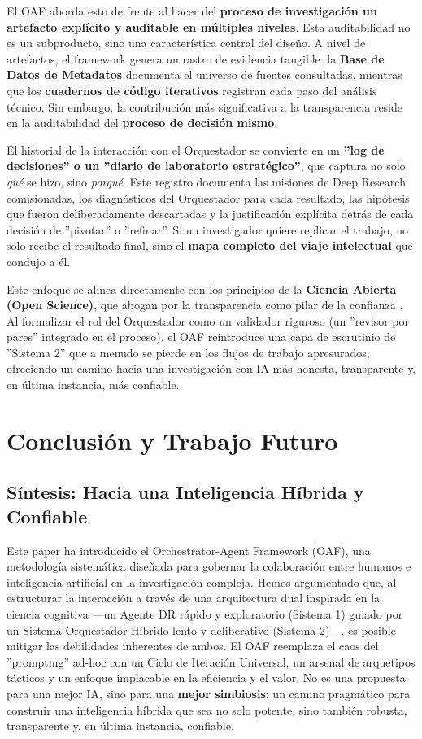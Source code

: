 \documentclass[11pt, a4paper]{article}
\begin{document}
El OAF aborda esto de frente al hacer del \textbf{proceso de investigación un artefacto explícito y auditable en múltiples niveles}. Esta auditabilidad no es un subproducto, sino una característica central del diseño. A nivel de artefactos, el framework genera un rastro de evidencia tangible: la \textbf{Base de Datos de Metadatos} documenta el universo de fuentes consultadas, mientras que los \textbf{cuadernos de código iterativos} registran cada paso del análisis técnico. Sin embargo, la contribución más significativa a la transparencia reside en la auditabilidad del \textbf{proceso de decisión mismo}.

El historial de la interacción con el Orquestador se convierte en un \textbf{''log de decisiones'' o un ''diario de laboratorio estratégico''}, que captura no solo \textit{qué} se hizo, sino \textit{porqué}. Este registro documenta las misiones de Deep Research comisionadas, los diagnósticos del Orquestador para cada resultado, las hipótesis que fueron deliberadamente descartadas y la justificación explícita detrás de cada decisión de ''pivotar'' o ''refinar''. Si un investigador quiere replicar el trabajo, no solo recibe el resultado final, sino el \textbf{mapa completo del viaje intelectual} que condujo a él.

Este enfoque se alinea directamente con los principios de la \textbf{Ciencia Abierta (Open Science)}, que abogan por la transparencia como pilar de la confianza \cite{opus2025}. Al formalizar el rol del Orquestador como un validador riguroso (un ''revisor por pares'' integrado en el proceso), el OAF reintroduce una capa de escrutinio de ''Sistema 2'' que a menudo se pierde en los flujos de trabajo apresurados, ofreciendo un camino hacia una investigación con IA más honesta, transparente y, en última instancia, más confiable.

\section{Conclusión y Trabajo Futuro}
\label{sec:conclusion}

\subsection{Síntesis: Hacia una Inteligencia Híbrida y Confiable}
Este paper ha introducido el Orchestrator-Agent Framework (OAF), una metodología sistemática diseñada para gobernar la colaboración entre humanos e inteligencia artificial en la investigación compleja. Hemos argumentado que, al estructurar la interacción a través de una arquitectura dual inspirada en la ciencia cognitiva —un Agente DR rápido y exploratorio (Sistema 1) guiado por un Sistema Orquestador Híbrido lento y deliberativo (Sistema 2)—, es posible mitigar las debilidades inherentes de ambos. El OAF reemplaza el caos del ''prompting'' ad-hoc con un Ciclo de Iteración Universal, un arsenal de arquetipos tácticos y un enfoque implacable en la eficiencia y el valor. No es una propuesta para una mejor IA, sino para una \textbf{mejor simbiosis}: un camino pragmático para construir una inteligencia híbrida que sea no solo potente, sino también robusta, transparente y, en última instancia, confiable.
\end{document}
